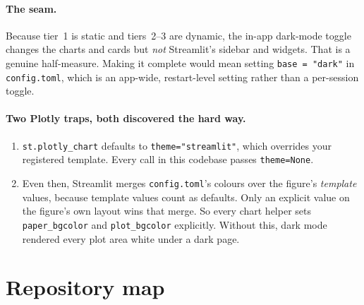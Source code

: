 \documentclass[11pt,a4paper]{article}
\newcommand{\file}[1]{\texttt{#1}}
\begin{document}
\paragraph{The seam.} Because tier~1 is static and tiers~2--3 are dynamic, the
in-app dark-mode toggle changes the charts and cards but \emph{not} Streamlit's
sidebar and widgets. That is a genuine half-measure. Making it complete would
mean setting \file{base = "dark"} in \file{config.toml}, which is an app-wide,
restart-level setting rather than a per-session toggle.

\paragraph{Two Plotly traps, both discovered the hard way.}
\begin{enumerate}
  \item \file{st.plotly\_chart} defaults to \file{theme="streamlit"}, which
        overrides your registered template. Every call in this codebase passes
        \file{theme=None}.
  \item Even then, Streamlit merges \file{config.toml}'s colours over the
        figure's \emph{template} values, because template values count as
        defaults. Only an explicit value on the figure's own layout wins that
        merge. So every chart helper sets
        \file{paper\_bgcolor} and \file{plot\_bgcolor} explicitly. Without this,
        dark mode rendered every plot area white under a dark page.
\end{enumerate}

\section{Repository map}
\end{document}
